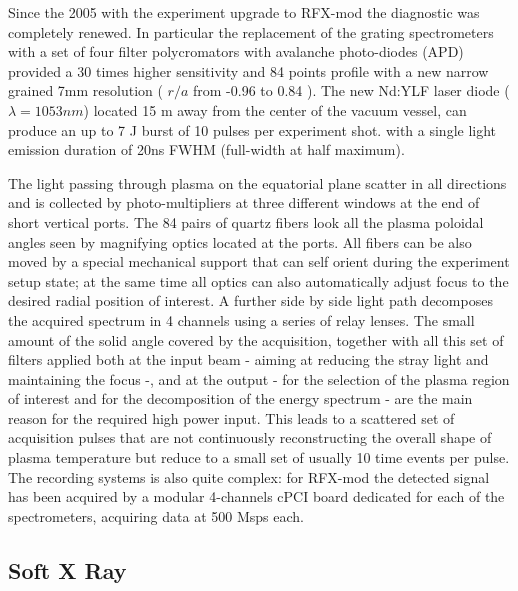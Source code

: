 Since the 2005 with the experiment upgrade to RFX-mod the diagnostic was completely renewed. In particular the replacement of the grating spectrometers with a set of four filter polycromators with avalanche photo-diodes (APD) provided a 30 times higher sensitivity and 84 points profile with a new narrow grained 7mm resolution ( $r/a$ from -0.96 to 0.84 ).
The new Nd:YLF laser diode ($\lambda=1053 nm$) located 15 m away from the center of the vacuum vessel, can produce an up to 7 J burst of 10 pulses per experiment shot. with a single light emission duration of 20ns FWHM (full-width at half maximum).

The light passing through plasma on the equatorial plane scatter in all directions and is collected by photo-multipliers at three different windows at the end of short vertical ports. The 84 pairs of quartz fibers look all the plasma poloidal angles seen by magnifying optics located at the ports. All fibers can be also moved by a special mechanical support that can self orient during the experiment setup state; at the same time all optics can also automatically adjust focus to the desired radial position of interest.
A further side by side light path decomposes the acquired spectrum in 4 channels using a series of relay lenses.
%
The small amount of the solid angle covered by the acquisition, together with all this set of filters applied both at the input beam - aiming at reducing the stray light and maintaining the focus -, and at the output - for the selection of the plasma region of interest and for the decomposition of the energy spectrum - are the main reason for the required high power input.
%
This leads to a scattered set of acquisition pulses that are not continuously reconstructing the overall shape of plasma temperature but reduce to a small set of usually 10 time events per pulse.
%
The recording systems is also quite complex: for RFX-mod the detected signal has been acquired by a modular 4-channels cPCI board dedicated for each of the spectrometers, acquiring data at 500 Msps each.

\subsection{Soft X Ray}


